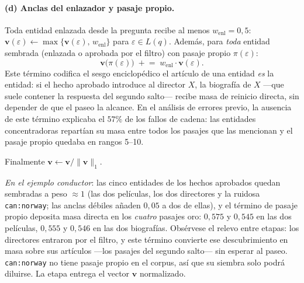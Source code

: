 \documentclass[11pt,a4paper]{article}
\newcommand{\norm}[1]{\lVert #1 \rVert}
\begin{document}
\paragraph{(d) Anclas del enlazador y pasaje propio.}
Toda entidad enlazada desde la pregunta recibe al menos
$w_{\text{enl}} = 0{,}5$:
$\mathbf{v}(\varepsilon) \leftarrow
\max\{\mathbf{v}(\varepsilon),\, w_{\text{enl}}\}$ para
$\varepsilon \in L(q)$. Además, para \emph{toda} entidad sembrada (enlazada
o aprobada por el filtro) con pasaje propio $\pi(\varepsilon)$:
\begin{equation}
\mathbf{v}\bigl(\pi(\varepsilon)\bigr) \;\mathrel{+}=\;
w_{\text{enl}}\cdot \mathbf{v}(\varepsilon).
\label{eq:pasaje-propio}
\end{equation}
Este término codifica el sesgo enciclopédico \guillemotleft{}el artículo de una entidad
\emph{es} la entidad\guillemotright{}: si el hecho aprobado introduce al director $X$, la
biografía de $X$ ---que suele contener la respuesta del segundo salto--- recibe
masa de reinicio directa, sin depender de que el paseo la alcance. En el
análisis de errores previo, la ausencia de este término explicaba el
$57\%$ de los fallos de cadena: las entidades concentradoras repartían su
masa entre todos los pasajes que las mencionan y el pasaje propio quedaba
en rangos 5--10.

Finalmente $\mathbf{v} \leftarrow \mathbf{v} / \norm{\mathbf{v}}_1$.

\emph{En el ejemplo conductor}: las cinco entidades de los hechos
aprobados quedan sembradas a peso $\approx 1$ (las dos películas, los dos
directores y la ruidosa \texttt{can:norway}; las anclas débiles añaden
$0{,}05$ a dos de ellas), y el término de pasaje propio deposita masa
directa en los \emph{cuatro} pasajes oro: $0{,}575$ y $0{,}545$ en las dos
películas, $0{,}555$ y $0{,}546$ en las dos biografías. Obsérvese el
relevo entre etapas: los directores entraron por el filtro, y este término
convierte ese descubrimiento en masa sobre sus artículos ---los pasajes
del segundo salto--- sin esperar al paseo. \texttt{can:norway} no tiene
pasaje propio en el corpus, así que su siembra solo podrá diluirse. La
etapa entrega el vector $\mathbf{v}$ normalizado.
\end{document}
